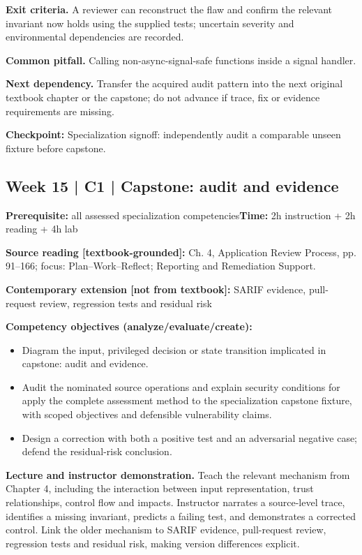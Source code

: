 \documentclass[10pt,letterpaper]{article}
\begin{document}
\textbf{Exit criteria.} A reviewer can reconstruct the flaw and confirm the relevant invariant now holds using the supplied tests; uncertain severity and environmental dependencies are recorded.

\textbf{Common pitfall.} Calling non-async-signal-safe functions inside a signal handler.

\textbf{Next dependency.} Transfer the acquired audit pattern into the next original textbook chapter or the capstone; do not advance if trace, fix or evidence requirements are missing.

\begin{historynote}\textbf{Checkpoint:} Specialization signoff: independently audit a comparable unseen fixture before capstone.\end{historynote}
\subsection{Week 15 | C1 | Capstone: audit and evidence}
\textbf{Prerequisite:} all assessed specialization competencies\hfill\textbf{Time:} 2h instruction + 2h reading + 4h lab

\textbf{Source reading [textbook-grounded]:} Ch. 4, Application Review Process, pp. 91--166; focus: Plan--Work--Reflect; Reporting and Remediation Support.

\textbf{Contemporary extension [not from textbook]:} SARIF evidence, pull-request review, regression tests and residual risk

\textbf{Competency objectives (analyze/evaluate/create):}
\begin{itemize}[leftmargin=*,itemsep=2pt]
\item Diagram the input, privileged decision or state transition implicated in capstone: audit and evidence.
\item Audit the nominated source operations and explain security conditions for apply the complete assessment method to the specialization capstone fixture, with scoped objectives and defensible vulnerability claims.
\item Design a correction with both a positive test and an adversarial negative case; defend the residual-risk conclusion.
\end{itemize}
\textbf{Lecture and instructor demonstration.} Teach the relevant mechanism from Chapter 4, including the interaction between input representation, trust relationships, control flow and impacts. Instructor narrates a source-level trace, identifies a missing invariant, predicts a failing test, and demonstrates a corrected control. Link the older mechanism to SARIF evidence, pull-request review, regression tests and residual risk, making version differences explicit.
\end{document}
